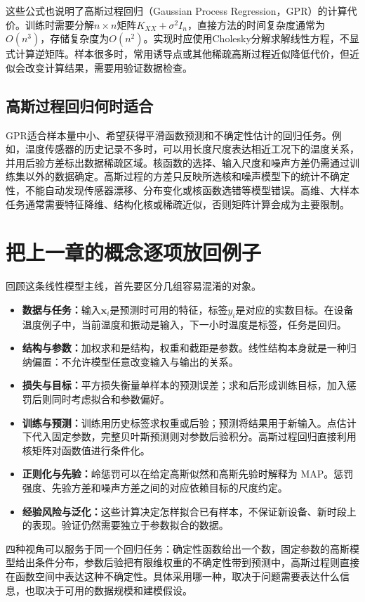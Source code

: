 这些公式也说明了高斯过程回归（Gaussian Process Regression，GPR）的计算代价。训练时需要分解$n\times n$矩阵$K_{XX}+\sigma^2I_n$，直接方法的时间复杂度通常为$O(n^3)$，存储复杂度为$O(n^2)$。实现时应使用Cholesky分解求解线性方程，不显式计算逆矩阵。样本很多时，常用诱导点或其他稀疏高斯过程近似降低代价，但近似会改变计算结果，需要用验证数据检查。

\subsection{高斯过程回归何时适合}
GPR适合样本量中小、希望获得平滑函数预测和不确定性估计的回归任务。例如，温度传感器的历史记录不多时，可以用长度尺度表达相近工况下的温度关系，并用后验方差标出数据稀疏区域。核函数的选择、输入尺度和噪声方差仍需通过训练集以外的数据确定。高斯过程的方差只反映所选核和噪声模型下的统计不确定性，不能自动发现传感器漂移、分布变化或核函数选错等模型错误。高维、大样本任务通常需要特征降维、结构化核或稀疏近似，否则矩阵计算会成为主要限制。

\section{把上一章的概念逐项放回例子}
回顾这条线性模型主线，首先要区分几组容易混淆的对象。
\begin{itemize}
 \item \textbf{数据与任务：}输入$\bm x_i$是预测时可用的特征，标签$y_i$是对应的实数目标。在设备温度例子中，当前温度和振动是输入，下一小时温度是标签，任务是回归。
 \item \textbf{结构与参数：}加权求和是结构，权重和截距是参数。线性结构本身就是一种归纳偏置：不允许模型任意改变输入与输出的关系。
 \item \textbf{损失与目标：}平方损失衡量单样本的预测误差；求和后形成训练目标，加入惩罚后则同时考虑拟合和参数偏好。
 \item \textbf{训练与预测：}训练用历史标签求权重或后验；预测将结果用于新输入。点估计下代入固定参数，完整贝叶斯预测则对参数后验积分。高斯过程回归直接利用核矩阵对函数值进行条件化。
 \item \textbf{正则化与先验：}岭惩罚可以在给定高斯似然和高斯先验时解释为 MAP。惩罚强度、先验方差和噪声方差之间的对应依赖目标的尺度约定。
 \item \textbf{经验风险与泛化：}这些计算决定怎样拟合已有样本，不保证新设备、新时段上的表现。验证仍然需要独立于参数拟合的数据。
\end{itemize}

四种视角可以服务于同一个回归任务：确定性函数给出一个数，固定参数的高斯模型给出条件分布，参数后验把有限维权重的不确定性带到预测中，高斯过程则直接在函数空间中表达这种不确定性。具体采用哪一种，取决于问题需要表达什么信息，也取决于可用的数据规模和建模假设。

